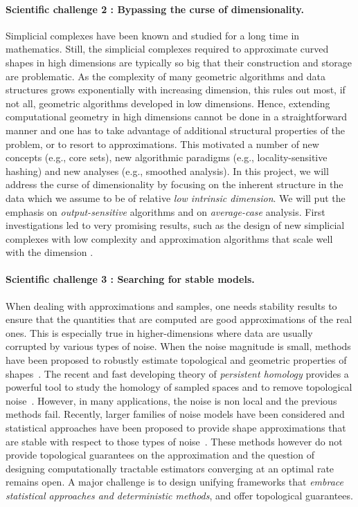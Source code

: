 \paragraph{Scientific challenge 2 :  Bypassing the curse of dimensionality.} 
Simplicial complexes have been known and studied for a long time in mathematics.  Still, the simplicial complexes required to approximate curved shapes in high dimensions are typically so big that their construction and storage are problematic. As the complexity of many geometric algorithms and data structures grows exponentially with increasing dimension, %
this rules out most, if not all, geometric algorithms developed in low dimensions.  Hence, extending computational geometry in high dimensions cannot be done in a straightforward manner and one has to take advantage of additional structural properties of the problem, or to resort to approximations. This motivated a number of new concepts (e.g., core sets), new algorithmic paradigms (e.g., locality-sensitive hashing) and new analyses (e.g., smoothed analysis).  In this project, we will address the curse of dimensionality by focusing on the inherent structure in the data which we assume to be of relative {\em low intrinsic dimension}.  We will put the emphasis on {\em output-sensitive} algorithms and on {\em average-case} analysis.  First investigations led to very promising results, such as the design of new simplicial complexes with low complexity and approximation algorithms that scale well with the dimension \cite{geometrica-7142i}.


\paragraph{Scientific challenge 3 : Searching for stable models.} 
When dealing with approximations and samples, one needs stability results to ensure that the quantities that are computed are good approximations of the real ones. This is especially true in higher-dimensions where data are usually corrupted by various types of noise.  When the noise magnitude is small, methods have been proposed to robustly estimate topological and geometric properties of shapes~\cite{nsw-tvu-2011}.  The recent and fast developing theory of {\em persistent homology} provides a powerful tool to study  the homology of sampled spaces and to remove topological noise~\cite{eh-ph-2008}.
However, in  many applications, the noise is non local and the previous methods fail.
Recently,  larger families of noise models  have been considered and statistical approaches  have been proposed to provide shape approximations that are stable with respect to   those types of noise~\cite{gpvw-mme-2011}. These methods however do not provide topological guarantees on the approximation and the question of designing computationally tractable estimators converging at an optimal rate remains open. A major challenge is to design  unifying frameworks that {\em embrace statistical approaches and deterministic methods}, and offer topological guarantees.   

